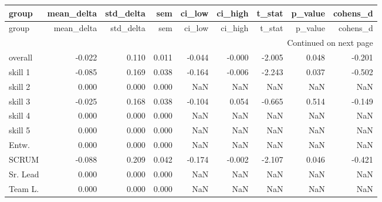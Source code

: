 \begin{longtable}{lrrrrrrrr}
\toprule
group & mean\_delta & std\_delta & sem & ci\_low & ci\_high & t\_stat & p\_value & cohens\_d \\
\midrule
\endfirsthead
\toprule
group & mean\_delta & std\_delta & sem & ci\_low & ci\_high & t\_stat & p\_value & cohens\_d \\
\midrule
\endhead
\midrule
\multicolumn{9}{r}{Continued on next page} \\
\midrule
\endfoot
\bottomrule
\endlastfoot
overall & -0.022 & 0.110 & 0.011 & -0.044 & -0.000 & -2.005 & 0.048 & -0.201 \\
skill 1 & -0.085 & 0.169 & 0.038 & -0.164 & -0.006 & -2.243 & 0.037 & -0.502 \\
skill 2 & 0.000 & 0.000 & 0.000 & NaN & NaN & NaN & NaN & NaN \\
skill 3 & -0.025 & 0.168 & 0.038 & -0.104 & 0.054 & -0.665 & 0.514 & -0.149 \\
skill 4 & 0.000 & 0.000 & 0.000 & NaN & NaN & NaN & NaN & NaN \\
skill 5 & 0.000 & 0.000 & 0.000 & NaN & NaN & NaN & NaN & NaN \\
Entw. & 0.000 & 0.000 & 0.000 & NaN & NaN & NaN & NaN & NaN \\
SCRUM & -0.088 & 0.209 & 0.042 & -0.174 & -0.002 & -2.107 & 0.046 & -0.421 \\
Sr. Lead & 0.000 & 0.000 & 0.000 & NaN & NaN & NaN & NaN & NaN \\
Team L. & 0.000 & 0.000 & 0.000 & NaN & NaN & NaN & NaN & NaN \\
\end{longtable}
